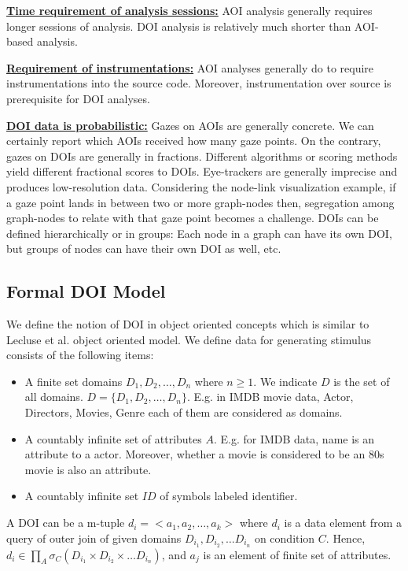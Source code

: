 \textbf{\underline{Time requirement of analysis sessions:}} AOI analysis generally requires longer sessions of analysis. DOI analysis is relatively much shorter than AOI-based analysis.

\textbf{\underline{Requirement of instrumentations:}} AOI analyses generally do to require instrumentations into the source code. Moreover, instrumentation over source is prerequisite for DOI analyses. 

\textbf{\underline{DOI data is probabilistic:}}  Gazes on AOIs are generally concrete. We can certainly report which AOIs received how many gaze points. On the contrary, gazes on DOIs are generally in fractions. Different algorithms or scoring methods yield different fractional scores to DOIs. Eye-trackers are generally imprecise and produces low-resolution data. Considering the node-link visualization example, if a gaze point lands in between two or more graph-nodes then, segregation among graph-nodes to relate with that gaze point becomes a challenge. 
DOIs can be defined hierarchically or in groups: Each node in a graph can have its own DOI, but groups of nodes can have their own DOI as well, etc.

\subsection{Formal DOI Model}
\label{sec:FormalDOIModel}

We define the notion of DOI in object oriented concepts which is similar to Lecluse et al. \cite{lecluse1988o2} object oriented model. 
We define data for generating stimulus consists of the following items:
\begin{itemize}
	\item A finite set domains $D_1, D_2, \ldots, D_n$ where $n \geq 1$. We indicate $D$ is the set of all domains. $D = \{D_1, D_2, \ldots, D_n\}$. E.g. in IMDB movie data, Actor, Directors, Movies, Genre each of them are considered as domains.
	\item A countably infinite set of attributes $A$. E.g. for IMDB data, name is an attribute to a actor. Moreover, whether a movie is considered to be an 80s movie is also an attribute. 
	\item A countably infinite set $ID$ of symbols labeled identifier. 
\end{itemize}

A DOI can be a m-tuple $d_i= <a_1 , a_2, \ldots, a_k>$ where $d_i$ is a data element from a query of outer join of given domains $D_{i_1}, D_{i_2}, \ldots D_{i_n}$ on condition $C$. Hence, $d_i \in \prod_{A} \sigma _{C} (D_{i_1} \times D_{i_2} \times \ldots D_{i_n})$, and $a_j$ is an element of finite set of attributes. 

